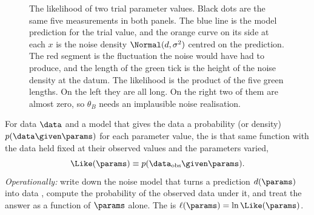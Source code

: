 \begin{figure}[htbp]
\centering
{}
\caption{The likelihood of two trial parameter values. Black dots are the
same five measurements in both panels. The blue line is the model prediction
for the trial value, and the orange curve on its side at each $x$ is the
noise density $\Normal(d,\sigma^2)$ centred on the prediction. The red
segment is the fluctuation the noise would have had to produce, and the
length of the green tick is the height of the noise density at the datum.
The likelihood is the product of the five green lengths. On the left they
are all long. On the right two of them are almost zero, so $\theta_B$ needs
an implausible noise realisation.}
\label{3b:fig:residual-gaussians}
\end{figure}

\begin{workdef}[likelihood]
For data $\data$ and a model that gives the data a probability
(or density) $p(\data\given\params)$ for each parameter value, the
 is that same function with the data held fixed at
their observed values and the parameters varied,
\[
  \Like(\params)\equiv p(\data_{\text{obs}}\given\params).
\]
\emph{Operationally:} write down the noise model that turns a prediction
$d(\params)$ into data , compute the probability of the observed data under it, and
treat the answer as a function of $\params$ alone. The
 is $\ell(\params)=\ln\Like(\params)$.
\end{workdef}

